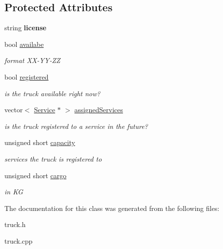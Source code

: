 \subsection*{Protected Attributes}
\begin{DoxyCompactItemize}
\item 
\mbox{\label{class_truck_a3dd293529f462f3a21838f9a6bc5a7d2}} 
string {\bfseries license}
\item 
\mbox{\label{class_truck_aba72f1b27aee018c99f2fd8f06858390}} 
bool \hyperlink{class_truck_aba72f1b27aee018c99f2fd8f06858390}{availabe}
\begin{DoxyCompactList}\small\item\em format X\+X-\/\+Y\+Y-\/\+ZZ \end{DoxyCompactList}\item 
\mbox{\label{class_truck_a80b8405cf7a15b236fef70116f99c4fb}} 
bool \hyperlink{class_truck_a80b8405cf7a15b236fef70116f99c4fb}{registered}
\begin{DoxyCompactList}\small\item\em is the truck available right now? \end{DoxyCompactList}\item 
\mbox{\label{class_truck_a3b153477458e5c93c1521ee2f4741638}} 
vector$<$ \hyperlink{class_service}{Service} $\ast$ $>$ \hyperlink{class_truck_a3b153477458e5c93c1521ee2f4741638}{assigned\+Services}
\begin{DoxyCompactList}\small\item\em is the truck registered to a service in the future? \end{DoxyCompactList}\item 
\mbox{\label{class_truck_a14541fad6d47c606ce4e1bd150a68a23}} 
unsigned short \hyperlink{class_truck_a14541fad6d47c606ce4e1bd150a68a23}{capacity}
\begin{DoxyCompactList}\small\item\em services the truck is registered to \end{DoxyCompactList}\item 
\mbox{\label{class_truck_a968fc6b1a6171a03e4254d6615da4ecd}} 
unsigned short \hyperlink{class_truck_a968fc6b1a6171a03e4254d6615da4ecd}{cargo}
\begin{DoxyCompactList}\small\item\em in KG \end{DoxyCompactList}\end{DoxyCompactItemize}


The documentation for this class was generated from the following files\+:\begin{DoxyCompactItemize}
\item 
truck.\+h\item 
truck.\+cpp\end{DoxyCompactItemize}
